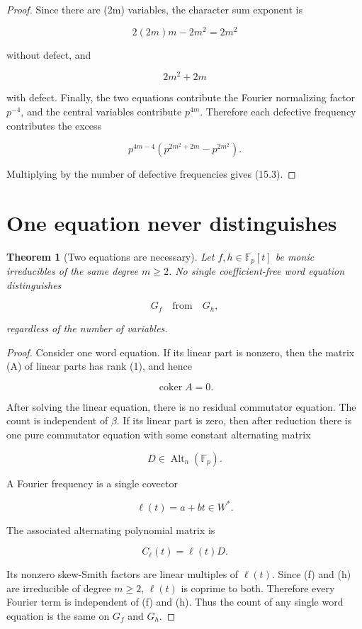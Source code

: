 \documentclass[11pt]{article}
\newtheorem{theorem}{Theorem}[section]
\begin{document}
\begin{proof}
Since there are (2m) variables, the character sum exponent is

\[
2(2m)m-2m^2=2m^2
\]

without defect, and

\[
2m^2+2m
\]

with defect. Finally, the two equations contribute the Fourier normalizing factor $p^{-4}$, and the central variables contribute $p^{4m}$. Therefore each defective frequency contributes the excess

\[
p^{4m-4}
\left(
p^{2m^2+2m}-p^{2m^2}
\right).
\]

Multiplying by the number of defective frequencies gives (15.3).

\end{proof}

\section{One equation never distinguishes}

\begin{theorem}[Two equations are necessary]
Let $f,h\in\mathbb F_p[t]$ be monic irreducibles of the same degree $m\ge2$. No single coefficient-free word equation distinguishes

\[
G_f
\quad\text{from}\quad
G_h,
\]

regardless of the number of variables.

\end{theorem}

\begin{proof}
Consider one word equation. If its linear part is nonzero, then the matrix (A) of linear parts has rank (1), and hence

\[
\operatorname{coker}A=0.
\]

After solving the linear equation, there is no residual commutator equation. The count is independent of $\beta$. If its linear part is zero, then after reduction there is one pure commutator equation with some constant alternating matrix

\[
D\in\operatorname{Alt}_n(\mathbb F_p).
\]

A Fourier frequency is a single covector

\[
\ell(t)=a+bt\in W^*.
\]

The associated alternating polynomial matrix is

\[
C_\ell(t)=\ell(t)D.
\]

Its nonzero skew-Smith factors are linear multiples of $\ell(t)$. Since (f) and (h) are irreducible of degree $m\ge2$, $\ell(t)$ is coprime to both. Therefore every Fourier term is independent of (f) and (h). Thus the count of any single word equation is the same on $G_f$ and $G_h$.

\end{proof}
\end{document}
